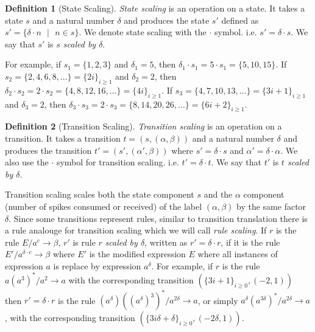 \documentclass[runningheads,a4paper]{llncs}
\theoremstyle{definition}
\newtheorem{definition2}{Definition}
\newcommand{\ra}{\rightarrow}
\newcommand{\se}{\text{ }}
\begin{document}

\begin{definition2}[State Scaling]
\emph{State scaling} is an operation on a state. It takes a state $s$ and a natural number
$\delta$ and produces the state $s'$ defined as $s' = \{\delta \cdot n\se|\se n\in s\}$. We
denote state scaling with the $\cdot$ symbol. i.e. $s'=\delta \cdot s$. We say that $s'$ is 
\emph{$s$ scaled by $\delta$}.
\end{definition2}

For example, if $s_1=\{1,2,3\}$ and $\delta_1=5$, then $\delta_1\cdot s_1 = 5\cdot s_1=\{5,10,15\}$.
If $s_2=\{2,4,6,8,...\}=\{2i\}_{i\geq 1}$ and $\delta_2=2$, then $\delta_2\cdot s_2=2\cdot s_2 =
\{4,8,12,16,...\}=\{4i\}_{i\geq 1}$. If $s_3=\{4,7,10,13,...\}=\{3i+1\}_{i\geq 1}$ and $\delta_3=2$,
then $\delta_3\cdot s_3 = 2\cdot s_3 = \{8,14,20,26,...\}=\{6i+2\}_{i\geq1}$.

\begin{definition2}[Transition Scaling]
\emph{Transition scaling} is an operation on a transition. It takes a transition $t=(s,(
\alpha,\beta))$ and a natural number $\delta$ and produces the transition $t'=(s',(\alpha',
\beta))$ where $s' = \delta \cdot s$ and $\alpha' = \delta \cdot \alpha$. We also use the $\cdot$
symbol for transition scaling. i.e. $t'=\delta\cdot t$. We say that $t'$ is \emph{$t$ scaled by 
$\delta$}.
\end{definition2}

Transition scaling scales both the state component $s$ and the $\alpha$ component (number of spikes
consumed or received) of the label $(\alpha,\beta)$ by the same factor $\delta$. Since some 
transitions represent rules, similar to transition translation there is a rule analouge for 
transition scaling which we will call \emph{rule scaling}. If $r$ is the rule $E/a^c \ra \beta$,
$r'$ is rule $r$ \emph{scaled by $\delta$}, written as $r'=\delta \cdot r$, if it is the rule
$E'/a^{\delta \cdot c} \ra \beta$ where $E'$ is the modified expression $E$ where all instances of 
expression $a$ is replace by expression $a^\delta$. For example, if $r$ is the rule $a(a^3)^*/a^2 \ra 
a$ with the corresponding transition $(\{3i+1\}_{i\geq 0},(-2,1))$ then
$r'=\delta \cdot r$ is the rule $(a^{\delta})((a^{\delta})^3)^*/a^{2\delta}\ra a$, or simply
$a^{\delta}(a^{3\delta})^*/a^{2\delta}\ra a$, with the corresponding transition $(
\{3i\delta+\delta\}_{i\geq 0},(-2\delta,1))$.
\end{document}
